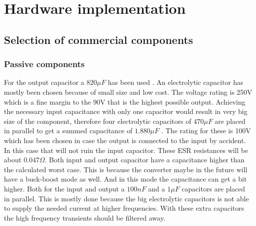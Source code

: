 
\chapter{Hardware implementation} \label{ch:hardware_implementation}

\section{Selection of commercial components}

\subsection{Passive components}
For the output capacitor a $820\mu F$ has been used \cite{cout}. An electrolytic capacitor has mostly been chosen because of small size and low cost. The voltage rating is 250V which is a fine margin to the 90V that is the highest possible output.  
Achieving the necessary input capacitance with only one capacitor would result in very big size of the component, therefore four electrolytic capacitors of $470\mu F$ \cite{cin} are placed in parallel to get a summed capacitance of $1.880\mu F$ . The rating for these is 100V which has been chosen in case the output is connected to the input by accident. In this case that will not ruin the input capacitor. These ESR resistances will be about $0.047\Omega$. Both input and output capacitor have a capacitance higher than the calculated worst case. This is because the converter maybe in the future will have a buck-boost mode as well. And in this mode the capacitance can get a bit higher. 
Both for the input and output a $100nF$ and a $1\mu F$  capacitors are placed in parallel. This is mostly done because the big electrolytic capacitors is not able to supply the needed current at higher frequencies. With these extra capacitors the high frequency transients should be filtered away.

